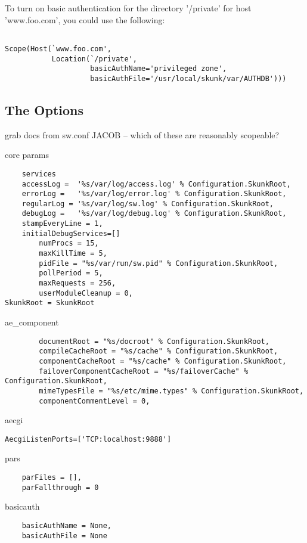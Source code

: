 \documentclass[titlepage]{manual}
\begin{document}
To turn on basic authentication for the directory '/private' for host 'www.foo.com', you could
use the following:
\begin{verbatim}

Scope(Host(`www.foo.com', 
           Location(`/private',
                    basicAuthName='privileged zone',
                    basicAuthFile='/usr/local/skunk/var/AUTHDB')))

\end{verbatim}	

\subsection{The Options}
grab docs from sw.conf
JACOB -- which of these are reasonably scopeable?

core params
\begin{verbatim}
    services
    accessLog =  '%s/var/log/access.log' % Configuration.SkunkRoot,
    errorLog =   '%s/var/log/error.log' % Configuration.SkunkRoot,
    regularLog = '%s/var/log/sw.log' % Configuration.SkunkRoot,
    debugLog =   '%s/var/log/debug.log' % Configuration.SkunkRoot,
    stampEveryLine = 1,
    initialDebugServices=[]
        numProcs = 15,
        maxKillTime = 5,
        pidFile = "%s/var/run/sw.pid" % Configuration.SkunkRoot,
        pollPeriod = 5,
        maxRequests = 256,
        userModuleCleanup = 0,
SkunkRoot = SkunkRoot
\end{verbatim}


ae_component
\begin{verbatim}
        documentRoot = "%s/docroot" % Configuration.SkunkRoot,
        compileCacheRoot = "%s/cache" % Configuration.SkunkRoot,
        componentCacheRoot = "%s/cache" % Configuration.SkunkRoot,
        failoverComponentCacheRoot = "%s/failoverCache" % Configuration.SkunkRoot,
        mimeTypesFile = "%s/etc/mime.types" % Configuration.SkunkRoot,
        componentCommentLevel = 0,
\end{verbatim}


aecgi
\begin{verbatim}
AecgiListenPorts=['TCP:localhost:9888']
\end{verbatim}


pars
\begin{verbatim}
    parFiles = [],
    parFallthrough = 0
\end{verbatim}


basicauth
\begin{verbatim}
    basicAuthName = None,
    basicAuthFile = None
\end{verbatim}
\end{document}
